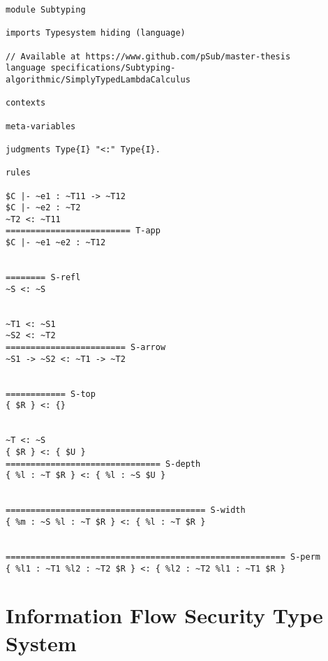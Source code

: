 \begin{lstlisting}[language=sltc]
module Subtyping

imports Typesystem hiding (language)

// Available at https://www.github.com/pSub/master-thesis
language specifications/Subtyping-algorithmic/SimplyTypedLambdaCalculus

contexts

meta-variables

judgments Type{I} "<:" Type{I}.

rules

$C |- ~e1 : ~T11 -> ~T12
$C |- ~e2 : ~T2
~T2 <: ~T11
========================= T-app
$C |- ~e1 ~e2 : ~T12


======== S-refl
~S <: ~S


~T1 <: ~S1
~S2 <: ~T2    
======================== S-arrow 
~S1 -> ~S2 <: ~T1 -> ~T2


============ S-top
{ $R } <: {}


~T <: ~S
{ $R } <: { $U }
=============================== S-depth
{ %l : ~T $R } <: { %l : ~S $U }


======================================== S-width
{ %m : ~S %l : ~T $R } <: { %l : ~T $R }


======================================================== S-perm
{ %l1 : ~T1 %l2 : ~T2 $R } <: { %l2 : ~T2 %l1 : ~T1 $R }
\end{lstlisting}
\newpage
\section{Information Flow Security Type System}
\label{sec:inform-flow-secur}

